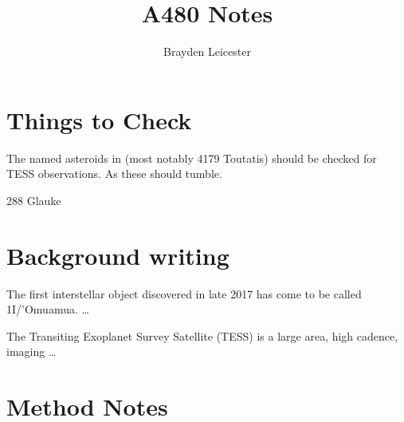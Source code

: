 \documentclass[12pt]{article}
\title{A480 Notes}
\author{Brayden Leicester}
\begin{document}
\maketitle

\section{Things to Check}
The named asteroids in \cite{Harris1994} (most notably 4179 Toutatis) should be checked for TESS observations. As these should tumble.

288 Glauke \cite{Harris2015}

\section{Background writing}

The first interstellar object discovered in late 2017 has come to be called 1I/'Omuamua. \dots

The Transiting Exoplanet Survey Satellite (TESS) \cite{Ricker2014} is a large area, high cadence, imaging \dots

\section{Method Notes}




\end{document}

